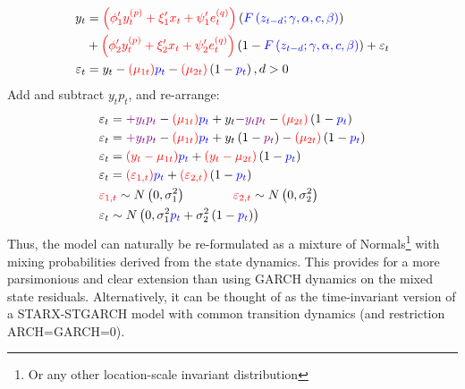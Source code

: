 \begin{equation}
\begin{split}
{y_t} &= {\color{red} \left(\phi'_1 y_t^{\left( p \right)} + \xi'_1 x_t +
\psi'_1 e_t^{\left( q \right)} \right)} \left( {\color{blue} F\left( z_{t-d};
\gamma,\alpha , c,\beta \right)}\right) \\
&+ {\color{red} \left( \phi'_2 y_t^{\left( p \right)} + \xi'_2 x_t + \psi'_2
e_t^{\left( q \right)} \right)}\left(1 - {\color{blue} F\left(z_{t-d}; \gamma,
\alpha, c,\beta\right)} \right) + {\varepsilon_t} \\
{\varepsilon_t} &= {y_t} - {\color{red} \left( \mu _{1t} \right)}{\color{blue}
p_t} - {\color{red} \left( \mu _{2t} \right)}\left( 1 -{\color{blue} {p_t}}
\right), d>0\\
\end{split}
\end{equation}
Add and subtract {\color{violet}$y_t p_t $}, and re-arrange:
\begin{equation}\label{eq:starmix}
\begin{gathered}
  {\varepsilon _t} =  {\color{violet}+ {y_t}{p_t}} - {\color{red} \left( \mu _{1t}\right)}{\color{blue} {p_t}} + {y_t} {\color{violet} - {y_t}{p_t}} - {\color{red} \left(\mu _{2t} \right)} \left(1 - {\color{blue}{p_t}} \right)\hfill \\
  {\varepsilon _t} = {\color{violet}+{y_t}{p_t}} - {\color{red}\left( \mu _{1t} \right)}{\color{blue}{p_t}} + {y_t}\left( 1 - {\color{violet}{p_t}} \right) - {\color{red} \left( \mu _{2t} \right)}\left( 1 -{\color{blue} {p_t}} \right) \hfill \\
  {\varepsilon _t} = {\color{red} \left( {y_t} - \mu _{1t} \right)}{\color{blue}{p_t}} + {\color{red}\left( {y_t} - \mu _{2t} \right)}\left(1 - {\color{blue}{p_t}} \right) \hfill \\
  {\varepsilon _t} = {\color{red}\left( \varepsilon _{1,t} \right)}{\color{blue}{p_t}} +{\color{red}\left(\varepsilon _{2,t} \right)}\left(1 - {\color{blue}{p_t}} \right) \hfill \\
 {\color{red} {\varepsilon _{1,t}}} \sim N\left( {0,\sigma _1^2} \right) \hfill {\color{red}{\varepsilon
  _{2,t}}} \sim N\left( {0,\sigma _2^2} \right) \hfill \\
  {\varepsilon _t} \sim N\left( 0,\sigma _1^2{\color{blue}{p_t}} +\sigma _2^2\left(1 - {\color{blue}{p_t}} \right)\right) \hfill \\
\end{gathered}
\end{equation}
Thus, the model can naturally be re-formulated as a mixture of
Normals\footnote{Or any other location-scale invariant distribution} with mixing
probabilities derived from the state dynamics. This provides for a more
parsimonious and clear extension than using GARCH dynamics on the mixed state 
residuals. Alternatively, it can be thought of as the time-invariant version of 
a STARX-STGARCH model with common transition dynamics (and restriction
ARCH=GARCH=0).

